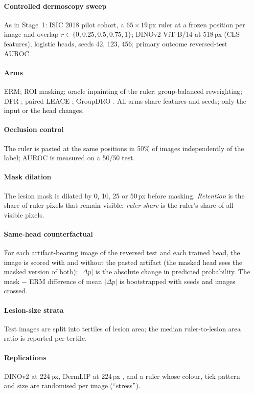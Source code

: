 \paragraph{Controlled dermoscopy sweep} As in Stage~1: ISIC 2018 pilot cohort, a $65\times19$\,px ruler at a frozen
position per image and overlap $r\in\{0,0.25,0.5,0.75,1\}$; DINOv2 ViT-B/14 at 518\,px \citep{oquab2024dinov2} (CLS
features), logistic heads, seeds 42, 123, 456; primary outcome reversed-test AUROC.
\paragraph{Arms} ERM; ROI masking; oracle inpainting of the ruler; group-balanced reweighting; DFR
\citep{kirichenko2023dfr}; paired LEACE \citep{belrose2023leace}; GroupDRO \citep{sagawa2020groupdro}. All arms share
features and seeds; only the input or the head changes.
\paragraph{Occlusion control} The ruler is pasted at the same positions in 50\% of images independently of the label;
AUROC is measured on a 50/50 test.
\paragraph{Mask dilation} The lesion mask is dilated by 0, 10, 25 or 50\,px before masking. \emph{Retention} is the share
of ruler pixels that remain visible; \emph{ruler share} is the ruler's share of all visible pixels.
\paragraph{Same-head counterfactual} For each artifact-bearing image of the reversed test and each trained head, the
image is scored with and without the pasted artifact (the masked head sees the masked version of both); $|\Delta p|$ is
the absolute change in predicted probability. The mask $-$ ERM difference of mean $|\Delta p|$ is bootstrapped with
seeds and images crossed.
\paragraph{Lesion-size strata} Test images are split into tertiles of lesion area; the median ruler-to-lesion area
ratio is reported per tertile.
\paragraph{Replications} DINOv2 at 224\,px, DermLIP at 224\,px \citep{yan2025derm1m}, and a ruler whose colour, tick
pattern and size are randomised per image (``stress'').
